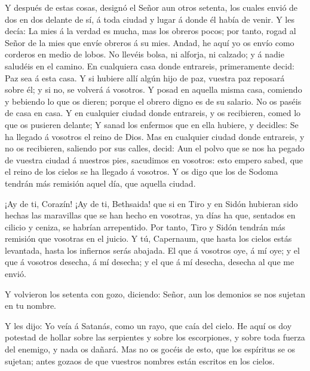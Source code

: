  Y después de estas cosas, designó el Señor aun otros
setenta, los cuales envió de dos en dos delante de sí, á toda ciudad y
lugar á donde él había de venir.  Y les decía: La mies á la
verdad es mucha, mas los obreros pocos; por tanto, rogad al Señor de la
mies que envíe obreros á su mies.  Andad, he aquí yo os
envío como corderos en medio de lobos.  No llevéis bolsa, ni
alforja, ni calzado; y á nadie saludéis en el camino.  En
cualquiera casa donde entrareis, primeramente decid: Paz sea á esta
casa.  Y si hubiere allí algún hijo de paz, vuestra paz
reposará sobre él; y si no, se volverá á vosotros.  Y posad
en aquella misma casa, comiendo y bebiendo lo que os dieren; porque el
obrero digno es de su salario. No os paséis de casa en casa.
 Y en cualquier ciudad donde entrareis, y os recibieren,
comed lo que os pusieren delante;  Y sanad los enfermos que
en ella hubiere, y decidles: Se ha llegado á vosotros el reino de Dios.
 Mas en cualquier ciudad donde entrareis, y no os
recibieren, saliendo por sus calles, decid:  Aun el polvo
que se nos ha pegado de vuestra ciudad á nuestros pies, sacudimos en
vosotros: esto empero sabed, que el reino de los cielos se ha llegado á
vosotros.  Y os digo que los de Sodoma tendrán más remisión
aquel día, que aquella ciudad.

 ¡Ay de ti, Corazín! ¡Ay de ti, Bethsaida! que si en Tiro y
en Sidón hubieran sido hechas las maravillas que se han hecho en
vosotras, ya días ha que, sentados en cilicio y ceniza, se habrían
arrepentido.  Por tanto, Tiro y Sidón tendrán más remisión
que vosotras en el juicio.  Y tú, Capernaum, que hasta los
cielos estás levantada, hasta los infiernos serás abajada. 
El que á vosotros oye, á mí oye; y el que á vosotros desecha, á mí
desecha; y el que á mí desecha, desecha al que me envió.

 Y volvieron los setenta con gozo, diciendo: Señor, aun los
demonios se nos sujetan en tu nombre.

 Y les dijo: Yo veía á Satanás, como un rayo, que caía del
cielo.  He aquí os doy potestad de hollar sobre las
serpientes y sobre los escorpiones, y sobre toda fuerza del enemigo, y
nada os dañará.  Mas no os gocéis de esto, que los
espíritus se os sujetan; antes gozaos de que vuestros nombres están
escritos en los cielos.

